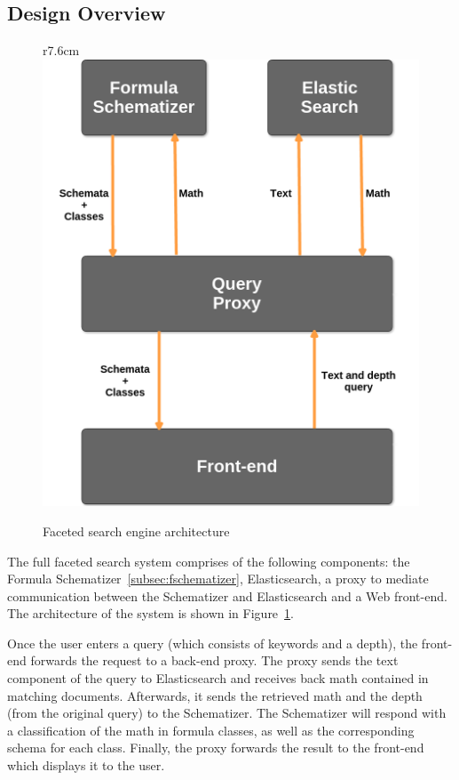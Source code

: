 \subsection{Design Overview}\label{subsec:design_overview}
\begin{figure}r{7.6cm}\vspace*{-1em}
    \includegraphics[scale=0.3]{img/SchemaArchitecture.png}
    \caption{Faceted search engine architecture}\label{fig:sys_architecture}
\end{figure}

The full faceted search system comprises of the following components: the
Formula Schematizer~\ref{subsec:fschematizer}, Elasticsearch, a proxy to
mediate communication between the Schematizer and Elasticsearch and a Web
front-end. The architecture of the system is shown in
Figure~\ref{fig:sys_architecture}. 

Once the user enters a query (which consists of keywords and a depth), the
front-end forwards the request to a back-end proxy. The proxy sends the
text component of the query to Elasticsearch and receives back math
contained in matching documents. Afterwards, it sends the retrieved math
and the depth (from the original query) to the Schematizer. The Schematizer
will respond with a classification of the math in formula classes, as well
as the corresponding schema for each class. Finally, the proxy forwards the
result to the front-end which displays it to the user.

